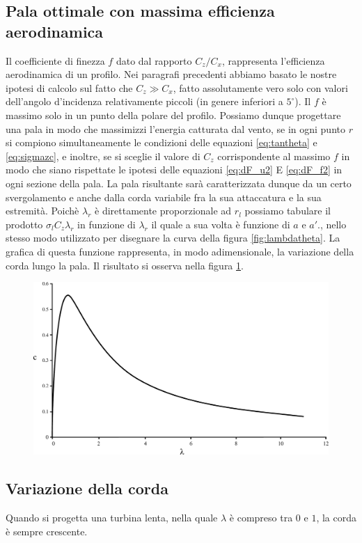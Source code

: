 \subsection{Pala ottimale con massima efficienza aerodinamica}
Il coefficiente di finezza $f$ dato dal rapporto $C_z/C_x$, rappresenta l'efficienza aerodinamica di un profilo. Nei paragrafi precedenti abbiamo basato le nostre ipotesi di calcolo sul fatto che $C_z \gg C_x $, fatto assolutamente vero solo con valori dell'angolo d'incidenza relativamente piccoli (in genere inferiori a $5^\circ$). Il $f$ è massimo solo in un punto della polare del profilo. Possiamo dunque progettare una pala in modo che massimizzi l'energia catturata dal vento, se in ogni punto $r$ si compiono simultaneamente le condizioni delle equazioni \ref{eq:tantheta} e \ref{eq:sigmazc}, e inoltre, se si sceglie il valore di $C_z$ corrispondente al massimo $f$ in modo che siano rispettate le ipotesi delle equazioni \ref{eq:dF_u2} E \ref{eq:dF_f2} in ogni sezione della pala. La pala risultante sarà caratterizzata dunque da un certo svergolamento e anche dalla corda variabile fra la sua attaccatura e la sua estremità. Poichè $\lambda_r$ è direttamente proporzionale ad $r_l$ possiamo tabulare il prodotto $\sigma_l C_z \lambda_r$ in funzione di $\lambda_r$ il quale a sua volta è funzione di $a$ e $a'$., nello stesso modo utilizzato per disegnare la curva della figura \ref{fig:lambdatheta}. La grafica di questa funzione rappresenta, in modo adimensionale, la variazione della corda lungo la pala. Il risultato si osserva nella figura \ref{fig:lambdacz}.
\begin{figure}[h!]
\centering
  \includegraphics[width=.7\textwidth]{fig/lambdacz.pdf}
\caption{}
\label{fig:lambdacz}
\end{figure}
\subsection{Variazione della corda}
Quando si progetta una turbina lenta, nella quale $\lambda$ è compreso tra $0$ e $1$, la corda è sempre crescente. 

